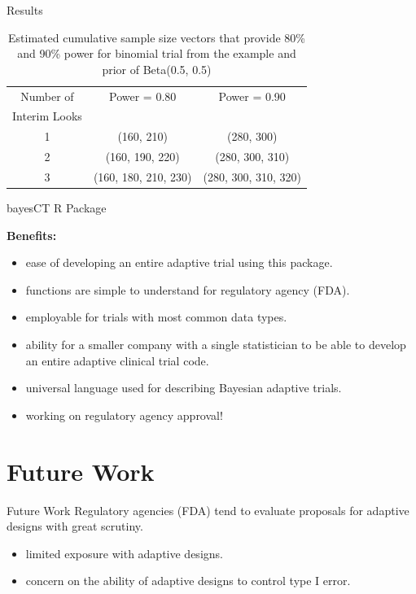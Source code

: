 \documentclass[12pt,t]{beamer}
\newcommand{\bi}{\begin{itemize}}
\newcommand{\ei}{\end{itemize}}
\begin{document}
\begin{frame}{Results}
\begin{table}
  \centering
 \begin{tabular}{|c | c | c |} 
 \hline
Number of  & Power = 0.80 & Power = 0.90 \\ 
Interim Looks & &  \\
 \hline\hline
 1 & (160, 210) & (280, 300)  \\ 
 \hline
 2 & (160, 190, 220) & (280, 300, 310) \\
 \hline
 3 & (160, 180, 210, 230) & (280, 300, 310, 320) \\ [1ex] 
 \hline
\end{tabular}
\caption{Estimated cumulative sample size vectors that provide 80\% and 90\% power for binomial trial from the example and prior of Beta(0.5, 0.5) } \label{tab:simresults}
\end{table}
\end{frame}




\begin{frame}{bayesCT R Package}

\textbf{Benefits:} \\
\begin{itemize}
\item ease of developing an entire adaptive trial using this package.
\item functions are simple to understand for regulatory agency (FDA).
\item employable for trials with most common data types.
\item ability for a smaller company with a single statistician to be able to develop an entire adaptive clinical trial code.
\item universal language used for describing Bayesian adaptive trials.
\item working on regulatory agency approval!
\end{itemize}
\end{frame}






\section{Future Work}


\begin{frame}{Future Work}
Regulatory agencies (FDA) tend to evaluate proposals for adaptive designs with great scrutiny.
\bi
\itemsep12pt
\item limited exposure with adaptive designs. 
\item concern on the ability of adaptive designs to control type I error.  
\ei
\vspace{24pt}

\end{frame}
\end{document}
